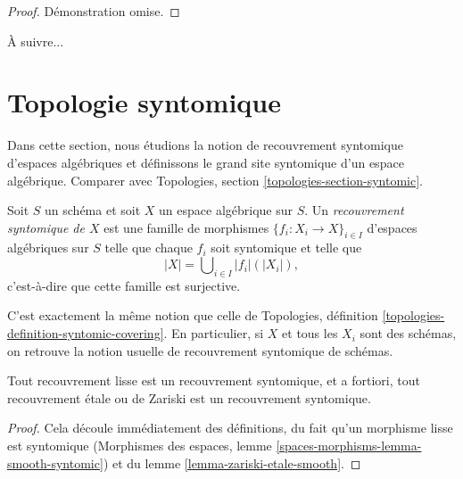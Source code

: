 \begin{proof}
Démonstration omise.
\end{proof}

\noindent
À suivre...









\section{Topologie syntomique}
\label{section-syntomic}

\noindent
Dans cette section, nous étudions la notion de recouvrement syntomique
d'espaces algébriques et définissons le grand site syntomique d'un
espace algébrique. Comparer avec
Topologies, section \ref{topologies-section-syntomic}.

\begin{definition}
\label{definition-syntomic-covering}
Soit $S$ un schéma et soit $X$ un espace algébrique sur $S$.
Un {\it recouvrement syntomique de $X$} est une famille de morphismes
$\{f_i : X_i \to X\}_{i \in I}$ d'espaces algébriques sur $S$
telle que chaque $f_i$ soit syntomique
et telle que
$$
|X| = \bigcup\nolimits_{i \in I} |f_i|(|X_i|),
$$
c'est-à-dire que cette famille est surjective.
\end{definition}

\noindent
C'est exactement la même notion que celle de
Topologies, définition \ref{topologies-definition-syntomic-covering}.
En particulier, si $X$ et tous les $X_i$ sont des schémas, on retrouve la
notion usuelle de recouvrement syntomique de schémas.

\begin{lemma}
\label{lemma-zariski-etale-smooth-syntomic}
Tout recouvrement lisse est un recouvrement syntomique, et a fortiori,
tout recouvrement \'etale ou de Zariski est un recouvrement syntomique.
\end{lemma}

\begin{proof}
Cela découle immédiatement des définitions, du fait qu'un morphisme lisse
est syntomique (Morphismes des espaces, lemme
\ref{spaces-morphisms-lemma-smooth-syntomic}) et du lemme
\ref{lemma-zariski-etale-smooth}.
\end{proof}

